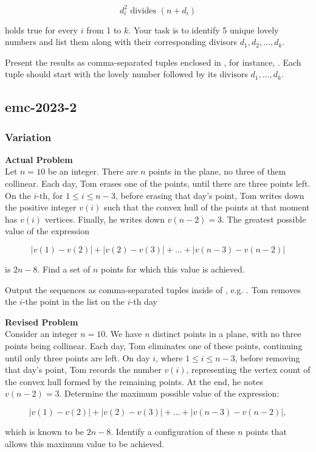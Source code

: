 $$d_i^2 \text{ divides } (n + d_i)$$

holds true for every \( i \) from 1 to \( k \). Your task is to identify 5 unique lovely numbers and list them along with their corresponding divisors \( d_1, d_2, \ldots, d_k \).

Present the results as comma-separated tuples enclosed in \boxed, for instance, . Each tuple should start with the lovely number followed by its divisors \( d_1, \ldots, d_k \).

\subsection{emc-2023-2}
\subsubsection{Variation}
\textbf{Actual Problem}\\
Let $n = 10$ be an integer. There are $n$ points in the plane, no three of them collinear. Each day, Tom erases one of the points, until there are three points left. On the $i$-th, for $1 \leqslant i \leqslant n -3$, before erasing that day's point, Tom writes down the positive integer $v(i)$ such that the convex hull of the points at that moment has $v(i)$ vertices. Finally, he writes down $v(n-2)=3$. The greatest possible value of the expression

$$|v(1) - v(2)| + |v(2) - v(3)| + ... + |v(n-3) - v(n-2)|$$

is $2n-8$. Find a set of $n$ points for which this value is achieved.

Output the sequences as comma-separated tuples inside of \boxed, e.g. . Tom removes the $i$-the point in the list on the $i$-th day

\textbf{Revised Problem}\\
Consider an integer $n = 10$. We have $n$ distinct points in a plane, with no three points being collinear. Each day, Tom eliminates one of these points, continuing until only three points are left. On day $i$, where $1 \leqslant i \leqslant n - 3$, before removing that day's point, Tom records the number $v(i)$, representing the vertex count of the convex hull formed by the remaining points. At the end, he notes $v(n-2) = 3$. Determine the maximum possible value of the expression:

$$|v(1) - v(2)| + |v(2) - v(3)| + \ldots + |v(n-3) - v(n-2)|,$$

which is known to be $2n-8$. Identify a configuration of these $n$ points that allows this maximum value to be achieved.

